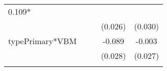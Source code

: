 \documentclass[]{article}
\begin{document}
\begin{longtable}[]{@{}lcccc@{}}
\begin{minipage}[t]{0.14\columnwidth}
0.109*\strut
\end{minipage}\tabularnewline
\begin{minipage}[t]{0.26\columnwidth}\raggedright\strut
\strut
\end{minipage} & \begin{minipage}[t]{0.12\columnwidth}\centering\strut
\strut
\end{minipage} & \begin{minipage}[t]{0.13\columnwidth}\centering\strut
\strut
\end{minipage} & \begin{minipage}[t]{0.14\columnwidth}\centering\strut
(0.026)\strut
\end{minipage} & \begin{minipage}[t]{0.14\columnwidth}\centering\strut
(0.030)\strut
\end{minipage}\tabularnewline
\begin{minipage}[t]{0.26\columnwidth}\raggedright\strut
typePrimary*VBM\strut
\end{minipage} & \begin{minipage}[t]{0.12\columnwidth}\centering\strut
\strut
\end{minipage} & \begin{minipage}[t]{0.13\columnwidth}\centering\strut
\strut
\end{minipage} & \begin{minipage}[t]{0.14\columnwidth}\centering\strut
-0.089\strut
\end{minipage} & \begin{minipage}[t]{0.14\columnwidth}\centering\strut
-0.003\strut
\end{minipage}\tabularnewline
\begin{minipage}[t]{0.26\columnwidth}\raggedright\strut
\strut
\end{minipage} & \begin{minipage}[t]{0.12\columnwidth}\centering\strut
\strut
\end{minipage} & \begin{minipage}[t]{0.13\columnwidth}\centering\strut
\strut
\end{minipage} & \begin{minipage}[t]{0.14\columnwidth}\centering\strut
(0.028)\strut
\end{minipage} & \begin{minipage}[t]{0.14\columnwidth}\centering\strut
(0.027)\strut
\end{minipage}\tabularnewline
\begin{minipage}[t]{0.26\columnwidth}\raggedright\strut

\end{minipage}
\end{longtable}
\end{document}
